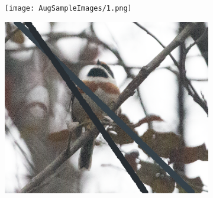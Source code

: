 \begin{figure}[H]
    \centering
    \begin{subfigure}{0.20\textwidth} %
        \texttt{[image: AugSampleImages/1.png]} %
    \end{subfigure}
    \begin{subfigure}{0.20\textwidth}
        \includegraphics[width=\linewidth]{AugSampleImages/1X.png}
    \end{subfigure}


\end{figure}

